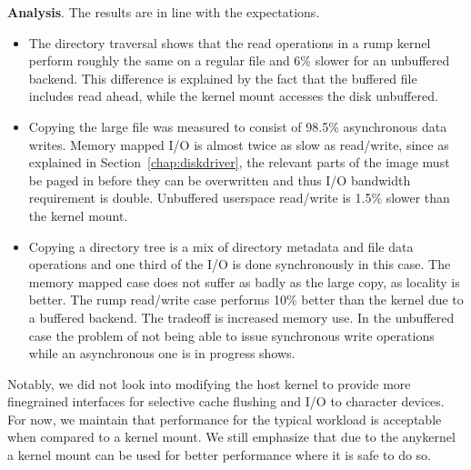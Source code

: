 \noindent
\textbf{Analysis}.  The results are in line with the expectations.
\begin{itemize}
\item   The directory traversal shows that the read operations
	in a rump kernel
        perform roughly the same on a regular file and 6\% slower
        for an unbuffered backend.  This difference is explained
        by the fact that the buffered file includes read ahead,
	 while the kernel mount accesses the disk unbuffered.

\item   Copying the large file was measured to consist of 98.5\% asynchronous data writes.
        Memory mapped I/O is almost twice as slow as read/write,
        since as explained in Section~\ref{chap:diskdriver}, the
        relevant parts of the image must be paged in before they
        can be overwritten and thus I/O bandwidth requirement is
        double.  Unbuffered userspace read/write is 1.5\% slower
        than the kernel mount.

\item   Copying a directory tree is a mix of directory metadata
        and file data operations and one third of the I/O is done
        synchronously in this case.  The memory mapped case does
        not suffer as badly as the large copy, as locality is
        better.  The rump read/write case performs 10\% better than
        the kernel due to a buffered backend.  The tradeoff is
        increased memory use.  In the unbuffered case the problem
        of not being able to issue synchronous write operations
        while an asynchronous one is in progress shows.
\end{itemize}

Notably, we did not look into modifying the host kernel to provide more
finegrained interfaces for selective cache flushing and I/O to character
devices.  For now, we maintain that performance for the typical workload
is acceptable when compared to a kernel mount.  We still emphasize that
due to the anykernel a kernel mount can be used for better performance
where it is safe to do so.


